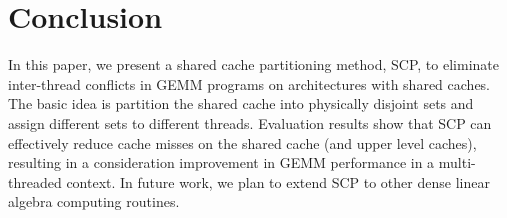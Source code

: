\section{Conclusion}\label{sec:conclusion}
In this paper, we present a shared cache partitioning method,
SCP, to eliminate inter-thread conflicts in GEMM programs
on architectures with shared caches.
The basic idea is partition the shared cache into physically
disjoint sets and assign different sets to different threads.
Evaluation results show that SCP can effectively reduce
cache misses on the shared cache (and upper level caches),
resulting in a consideration improvement in GEMM performance
in a multi-threaded context.
In future work, we plan to extend SCP to other dense linear
algebra computing routines.

